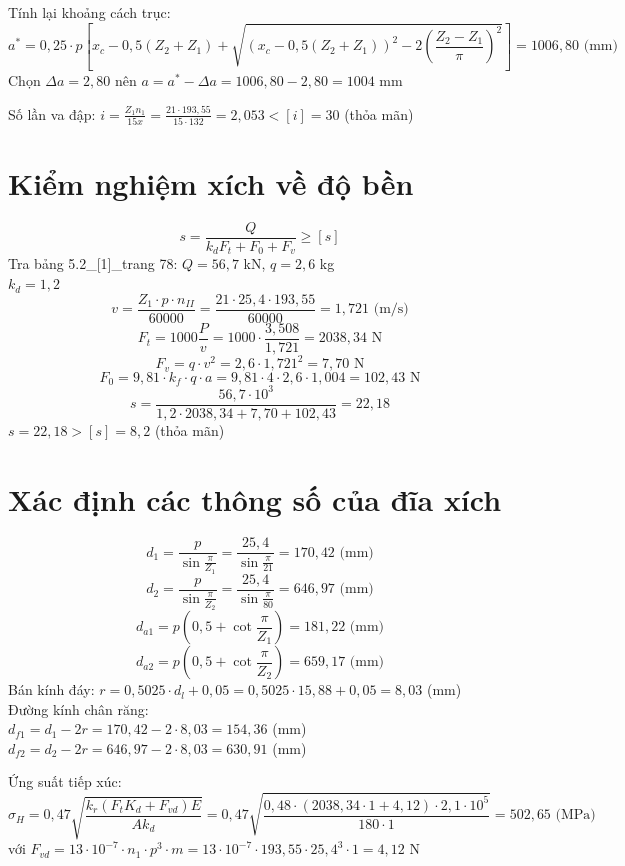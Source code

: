 \documentclass[12pt,a4paper]{report}
\begin{document}
Tính lại khoảng cách trục:
$$a^* = 0{,}25 \cdot p \left[ x_c - 0{,}5(Z_2 + Z_1) + \sqrt{\left(x_c - 0{,}5(Z_2 + Z_1)\right)^2 - 2\left(\frac{Z_2 - Z_1}{\pi}\right)^2} \right] = 1006{,}80 \text{ (mm)}$$
Chọn $\Delta a = 2{,}80$ nên $a = a^* - \Delta a = 1006{,}80 - 2{,}80 = 1004$ mm

Số lần va đập: $i = \frac{Z_1 n_1}{15x} = \frac{21 \cdot 193{,}55}{15 \cdot 132} = 2{,}053 < [i] = 30$ (thỏa mãn)

\section{Kiểm nghiệm xích về độ bền}
$$s = \frac{Q}{k_d F_t + F_0 + F_v} \geq [s]$$
Tra bảng 5.2\_[1]\_trang 78: $Q = 56{,}7$ kN, $q = 2{,}6$ kg\\
$k_d = 1{,}2$
$$v = \frac{Z_1 \cdot p \cdot n_{II}}{60000} = \frac{21 \cdot 25{,}4 \cdot 193{,}55}{60000} = 1{,}721 \text{ (m/s)}$$
$$F_t = 1000 \frac{P}{v} = 1000 \cdot \frac{3{,}508}{1{,}721} = 2038{,}34 \text{ N}$$
$$F_v = q \cdot v^2 = 2{,}6 \cdot 1{,}721^2 = 7{,}70 \text{ N}$$
$$F_0 = 9{,}81 \cdot k_f \cdot q \cdot a = 9{,}81 \cdot 4 \cdot 2{,}6 \cdot 1{,}004 = 102{,}43 \text{ N}$$
$$s = \frac{56{,}7 \cdot 10^3}{1{,}2 \cdot 2038{,}34 + 7{,}70 + 102{,}43} = 22{,}18$$
$s = 22{,}18 > [s] = 8{,}2$ (thỏa mãn)

\section{Xác định các thông số của đĩa xích}
$$d_1 = \frac{p}{\sin\frac{\pi}{Z_1}} = \frac{25{,}4}{\sin\frac{\pi}{21}} = 170{,}42 \text{ (mm)}$$
$$d_2 = \frac{p}{\sin\frac{\pi}{Z_2}} = \frac{25{,}4}{\sin\frac{\pi}{80}} = 646{,}97 \text{ (mm)}$$
$$d_{a1} = p\left(0{,}5 + \cot\frac{\pi}{Z_1}\right) = 181{,}22 \text{ (mm)}$$
$$d_{a2} = p\left(0{,}5 + \cot\frac{\pi}{Z_2}\right) = 659{,}17 \text{ (mm)}$$
Bán kính đáy: $r = 0{,}5025 \cdot d_l + 0{,}05 = 0{,}5025 \cdot 15{,}88 + 0{,}05 = 8{,}03$ (mm)\\
Đường kính chân răng:\\
$d_{f1} = d_1 - 2r = 170{,}42 - 2 \cdot 8{,}03 = 154{,}36$ (mm)\\
$d_{f2} = d_2 - 2r = 646{,}97 - 2 \cdot 8{,}03 = 630{,}91$ (mm)

Ứng suất tiếp xúc:
$$\sigma_H = 0{,}47\sqrt{\frac{k_r(F_t K_d + F_{vd})E}{Ak_d}} = 0{,}47\sqrt{\frac{0{,}48 \cdot (2038{,}34 \cdot 1 + 4{,}12) \cdot 2{,}1 \cdot 10^5}{180 \cdot 1}} = 502{,}65 \text{ (MPa)}$$
với $F_{vd} = 13 \cdot 10^{-7} \cdot n_1 \cdot p^3 \cdot m = 13 \cdot 10^{-7} \cdot 193{,}55 \cdot 25{,}4^3 \cdot 1 = 4{,}12$ N
\end{document}
